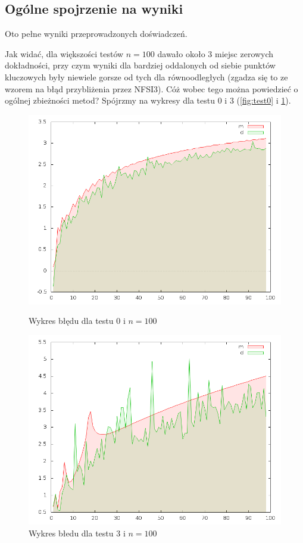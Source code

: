 \documentclass[11pt,wide]{mwart}
\begin{document}
\subsection{Ogólne spojrzenie na wyniki}
Oto pełne wyniki przeprowadzonych doświadczeń.

Jak widać, dla większości testów $n=100$ dawało około 3 miejsc zerowych dokładności, przy czym wyniki dla bardziej oddalonych od siebie punktów kluczowych były niewiele gorsze od tych dla równoodległych (zgadza się to ze wzorem na błąd przybliżenia przez NFSI3). Cóż wobec tego można powiedzieć o ogólnej zbieżności metod? Spójrzmy na wykresy dla testu 0 i 3 (\ref{fig:test0} i \ref{fig:test3}).\\
\begin{figure}[!h]
  \begin{minipage}[b]{0.45\linewidth}
    \centering
    \includegraphics[width=\linewidth]{./wykresy/test0_diff.png}
    \caption{Wykres błędu dla testu 0 i $n=100$}
    \label{fig:test0}
  \end{minipage}
  \hspace{0.5cm}
  \begin{minipage}[b]{0.45\linewidth}
    \centering
    \includegraphics[width=\linewidth]{./wykresy/test3_diff.png}
    \caption{Wykres błedu dla testu 3 i $n=100$}
    \label{fig:test3}
  \end{minipage}
\end{figure}
\end{document}
